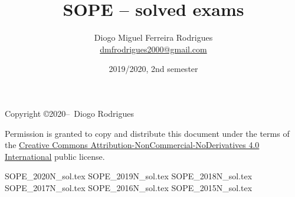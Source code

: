 \documentclass{sope}
\title{SOPE -- solved exams}
\author{Diogo Miguel Ferreira Rodrigues \\ \href{mailto:dmfrodrigues2000@gmail.com}{dmfrodrigues2000@gmail.com}}
\date{2019/2020, 2nd semester}
\begin{document}
\frontmatter
\maketitle
\begin{secondpage}
    Copyright \copyright 2020--\the\year\ Diogo Rodrigues\par
    Permission is granted to copy and distribute this document under the terms of the
    \href{https://creativecommons.org/licenses/by-nc-nd/4.0/}{Creative Commons Attribution-NonCommercial-NoDerivatives 4.0 International}
    public license.
\end{secondpage}
\setcounter{tocdepth}{2}
\tableofcontents
\mainmatter
{SOPE_2020N_sol.tex}
{SOPE_2019N_sol.tex}
{SOPE_2018N_sol.tex}
{SOPE_2017N_sol.tex}
{SOPE_2016N_sol.tex}
{SOPE_2015N_sol.tex}
\end{document}
